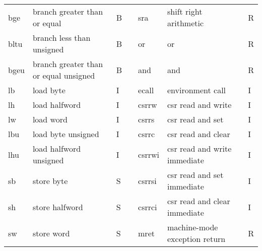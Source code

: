 \documentclass[../specifications.tex]{subfiles}
\begin{document}
\begin{table}[]
\begin{tabular}{lllllll}
    bge                      & branch greater than or equal          & B                       &                       & sra                     & shift right arithmetic       & R                       \\
    bltu                     & branch less than unsigned             & B                       &                       & or                      & or                           & R                       \\
    bgeu                     & branch greater than or equal unsigned & B                       &                       & and                     & and                          & R                       \\
    lb                       & load byte                             & I                       &                       & ecall                   & environment call             & I                       \\
    lh                       & load halfword                         & I                       &                       & csrrw                   & csr read and write           & I                       \\
    lw                       & load word                             & I                       &                       & csrrs                   & csr read and set             & I                       \\
    lbu                      & load byte unsigned                    & I                       &                       & csrrc                   & csr read and clear           & I                       \\
    lhu                      & load halfword unsigned                & I                       &                       & csrrwi                  & csr read and write immediate & I                       \\
    sb                       & store byte                            & S                       &                       & csrrsi                  & csr read and set immediate   & I                       \\
    sh                       & store halfword                        & S                       &                       & csrrci                  & csr read and clear immediate & I                       \\
    sw                       & store word                            & S                       &                       & mret                    & machine-mode exception return& R                       \\

\end{tabular}
\end{table}
\end{document}
